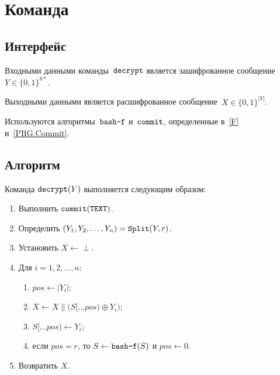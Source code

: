 \section{Команда }\label{PRG.Decrypt}

\subsection{Интерфейс}\label{PRG.Decrypt.IFace}

Входными данными команды~$\texttt{decrypt}$ является зашифрованное 
сообщение~$Y\in\{0,1\}^{8*}$.

Выходными данными является расшифрованное сообщение~$X\in\{0,1\}^{|Y|}$.

Используются алгоритмы~$\texttt{bash-f}$ и~$\texttt{commit}$, 
определенные в~\ref{F} и~\ref{PRG.Commit}.

\subsection{Алгоритм}\label{PRG.Decrypt.Alg}

Команда $\texttt{decrypt}(Y)$ выполняется следующим образом:
\begin{enumerate}
\item
Выполнить
$\texttt{commit}(\texttt{TEXT})$.
\item
Определить
$(Y_1,Y_2,\ldots,Y_n)=\mathop{\texttt{Split}}\nolimits(Y,r)$.
\item
Установить
$X\leftarrow\perp$.
\item
Для $i=1,2,\ldots,n$:
\begin{enumerate}
\item
$pos\leftarrow |Y_i|$;
\item
$X\leftarrow X\parallel\bigl(S[\dots pos)\oplus Y_i\bigr)$;
\item
$S[\dots pos)\leftarrow Y_i$;
\item
если $pos=r$, то $S\leftarrow\texttt{bash-f}(S)$ и $pos\leftarrow 0$.
\end{enumerate}
\item
Возвратить $X$.
\end{enumerate}
